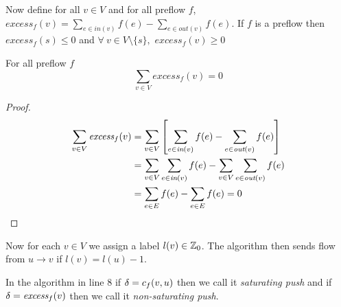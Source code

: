Now define for all $v\in V$ and for all preflow $f$, $\textit{excess}_f(v)=\sum\limits_{e\in\textit{in}(v)}f(e)-\sum\limits_{e\in\textit{out}(v)}f(e)$. If $f$ is a preflow then $\textit{excess}_f(s)\leq 0$ and $\forall\ v\in V\setminus\{s\},$ $\textit{excess}_f(v)\geq 0$
\begin{lemma}{}{}
	For all preflow $f$ $$\sum\limits_{v\in V}\textit{excess}_f(v)=0$$
\end{lemma}
\begin{proof}
	\begin{align*}
		\sum\limits_{v\in V}\textit{excess}_f(v) & = \sum\limits_{v\in V}\left[ \sum\limits_{e\in\textit{in}(v)}f(e)-\sum\limits_{e\in\textit{out}(v)}f(e)\right]\\
		& = \sum\limits_{v\in V}\sum\limits_{e\in\textit{in}(v)}f(e)-\sum\limits_{v\in V}\sum\limits_{e\in\textit{out}(v)}f(e)\\
		& = \sum_{e\in E}f(e)-\sum_{e\in E}f(e)=0
	\end{align*}
\end{proof}
Now for each $v\in V$ we assign a label $l(v)\in\mathbb{Z}_0$. The algorithm then sends flow from $u\to v$ if $l(v)=l(u)-1$.
\begin{center}
\end{center}
 \begin{algorithm}
 \DontPrintSemicolon
\caption{}
 \end{algorithm}
In the algorithm in line 8 if $\delta=c_f(v,u)$ then we call it \textit{saturating push} and if $\delta=\textit{excess}_f(v)$ then we call it \textit{non-saturating push}.


